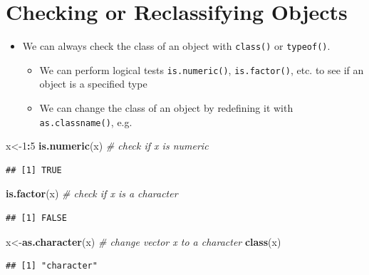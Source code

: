 \documentclass[]{book}
\newenvironment{Shaded}{\begin{snugshade}}{\end{snugshade}}
\newcommand{\KeywordTok}[1]{\textcolor[rgb]{0.13,0.29,0.53}{\textbf{#1}}}
\newcommand{\DecValTok}[1]{\textcolor[rgb]{0.00,0.00,0.81}{#1}}
\newcommand{\CommentTok}[1]{\textcolor[rgb]{0.56,0.35,0.01}{\textit{#1}}}
\newcommand{\OperatorTok}[1]{\textcolor[rgb]{0.81,0.36,0.00}{\textbf{#1}}}
\newcommand{\NormalTok}[1]{#1}
\providecommand{\tightlist}{%
  \setlength{\itemsep}{0pt}\setlength{\parskip}{0pt}}
\theoremstyle{definition}
\theoremstyle{definition}
\theoremstyle{definition}
\theoremstyle{remark}
\begin{document}
\section{Checking or Reclassifying
Objects}\label{checking-or-reclassifying-objects}

\begin{itemize}
\tightlist
\item
  We can always check the class of an object with \texttt{class()} or
  \texttt{typeof()}.

  \begin{itemize}
  \tightlist
  \item
    We can perform logical tests \texttt{is.numeric()},
    \texttt{is.factor()}, etc. to see if an object is a specified type
  \item
    We can change the class of an object by redefining it with
    \texttt{as.classname()}, e.g.
  \end{itemize}
\end{itemize}

\begin{Shaded}
\begin{Highlighting}[]
\NormalTok{x<-}\DecValTok{1}\OperatorTok{:}\DecValTok{5}
\KeywordTok{is.numeric}\NormalTok{(x) }\CommentTok{# check if x is numeric}
\end{Highlighting}
\end{Shaded}

\begin{verbatim}
## [1] TRUE
\end{verbatim}

\begin{Shaded}
\begin{Highlighting}[]
\KeywordTok{is.factor}\NormalTok{(x) }\CommentTok{# check if x is a character}
\end{Highlighting}
\end{Shaded}

\begin{verbatim}
## [1] FALSE
\end{verbatim}

\begin{Shaded}
\begin{Highlighting}[]
\NormalTok{x<-}\KeywordTok{as.character}\NormalTok{(x) }\CommentTok{# change vector x to a character}
\KeywordTok{class}\NormalTok{(x)}
\end{Highlighting}
\end{Shaded}

\begin{verbatim}
## [1] "character"
\end{verbatim}
\end{document}
